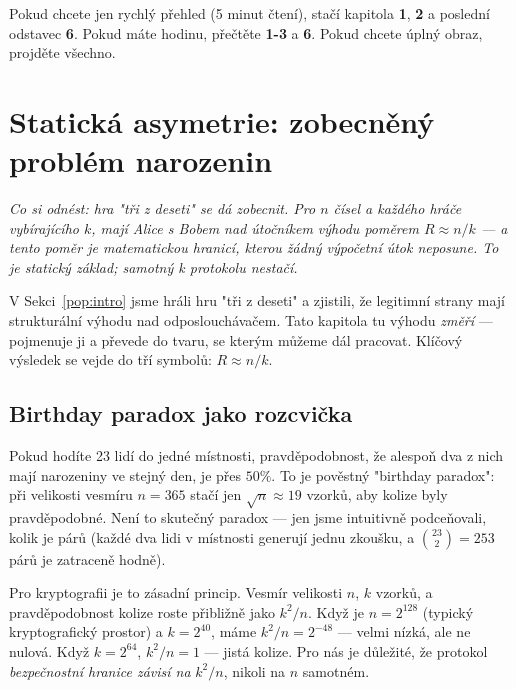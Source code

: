 \documentclass[11pt,a4paper]{article}
\begin{document}
Pokud chcete jen rychlý přehled (5 minut čtení), stačí kapitola \textbf{1}, \textbf{2} a poslední odstavec \textbf{6}. Pokud máte hodinu, přečtěte \textbf{1-3} a \textbf{6}. Pokud chcete úplný obraz, projděte všechno.

\bigskip


\section{Statická asymetrie: zobecněný problém narozenin}\label{pop:static}

\noindent\textit{Co si odnést: hra "tři z deseti" se dá zobecnit. Pro $n$ čísel a každého hráče vybírajícího $k$, mají Alice s Bobem nad útočníkem výhodu poměrem $R \approx n/k$ --- a tento poměr je matematickou hranicí, kterou žádný výpočetní útok neposune. To je \emph{statický} základ; samotný k protokolu nestačí.}

\medskip

V Sekci~\ref{pop:intro} jsme hráli hru "tři z deseti" a zjistili, že legitimní strany mají strukturální výhodu nad odposlouchávačem. Tato kapitola tu výhodu \emph{změří} --- pojmenuje ji a převede do tvaru, se kterým můžeme dál pracovat. Klíčový výsledek se vejde do tří symbolů: $R \approx n/k$.

\subsection{Birthday paradox jako rozcvička}

Pokud hodíte 23 lidí do jedné místnosti, pravděpodobnost, že alespoň dva z nich mají narozeniny ve stejný den, je přes $50\%$. To je pověstný "birthday paradox": při velikosti vesmíru $n = 365$ stačí jen $\sqrt{n} \approx 19$ vzorků, aby kolize byly pravděpodobné. Není to skutečný paradox --- jen jsme intuitivně podceňovali, kolik je párů (každé dva lidi v místnosti generují jednu zkoušku, a $\binom{23}{2} = 253$ párů je zatraceně hodně).

Pro kryptografii je to zásadní princip. Vesmír velikosti $n$, $k$ vzorků, a pravděpodobnost kolize roste přibližně jako $k^2 / n$. Když je $n = 2^{128}$ (typický kryptografický prostor) a $k = 2^{40}$, máme $k^2/n = 2^{-48}$ --- velmi nízká, ale ne nulová. Když $k = 2^{64}$, $k^2/n = 1$ --- jistá kolize. Pro nás je důležité, že protokol \emph{bezpečnostní hranice závisí na} $k^2/n$, nikoli na $n$ samotném.
\end{document}
